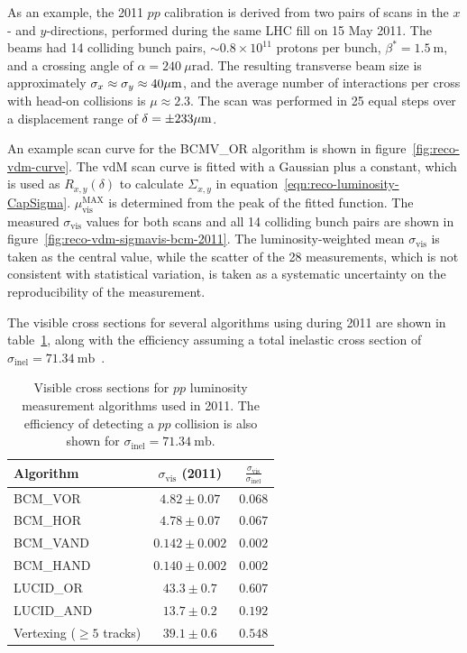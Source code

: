 As an example, the 2011 $pp$ calibration is derived from two pairs of scans in the $x$- and $y$-directions, performed during the same LHC fill on 15 May 2011. The beams had 14 colliding bunch pairs, $\sim0.8\times 10^11$ protons per bunch, $\beta^*=1.5~\mbox{m}$, and a crossing angle of $\alpha=240~\mu\mbox{rad}$. The resulting transverse beam size is approximately $\sigma_{x}\approx\sigma_{y}\approx 40 \mu\mathrm{m}$, and the average number of interactions per cross with head-on collisions is $\mu\approx 2.3$. The scan was performed in 25 equal steps over a displacement range of $\delta=\pm 233 \mu\mathrm{m}$.

An example scan curve for the BCMV\_OR algorithm is shown in figure~\ref{fig:reco-vdm-curve}. The vdM scan curve is fitted with a Gaussian plus a constant, which is used as $R_{x,y}(\delta)$ to calculate $\Sigma_{x,y}$ in equation~\ref{eqn:reco-luminosity-CapSigma}. $\mu_{\mathrm{vis}}^{\mathrm{MAX}}$ is determined from the peak of the fitted function. The measured $\sigma_{\mathrm{vis}}$ values for both scans and all 14 colliding bunch pairs are shown in figure~\ref{fig:reco-vdm-sigmavis-bcm-2011}. The luminosity-weighted mean $\sigma_{\mathrm{vis}}$ is taken as the central value, while the scatter of the 28 measurements, which is not consistent with statistical variation, is taken as a systematic uncertainty on the reproducibility of the measurement. 

The visible cross sections for several algorithms using during 2011 are shown in table~\ref{table:reco-luminosity-sigmavis-summary}, along with the efficiency assuming a total inelastic cross section of $\sigma_{\mathrm{inel}}= 71.34~\mbox{mb}$~\cite{TheATLASCollaboration:2014jo}.

\begin{table}[htbp]
	\centering
	\begin{tabular}{|l|c|c|}
		\hline
		Algorithm & $\sigma_{\mathrm{vis}}$ (2011) & $\frac{\sigma_{\mathrm{vis}}}{\sigma_{\mathrm{inel}}}$ \\
		\hline
		BCM\_VOR					&	$4.82\pm0.07$	&	$0.068$ \\
		\hline
		BCM\_HOR					&	$4.78\pm0.07$	&	$0.067$ \\
		\hline
		BCM\_VAND					&	$0.142\pm0.002$	&	$0.002$ \\
		\hline
		BCM\_HAND					&	$0.140\pm0.002$	&	$0.002$ \\
		\hline
		LUCID\_OR					&	$43.3\pm0.7$	&	$0.607$ \\
		\hline
		LUCID\_AND					&	$13.7\pm0.2$	&	$0.192$ \\
		\hline
		Vertexing ($\geq5$ tracks)	&	$39.1\pm0.6$	&	$0.548$ \\
		\hline
	\end{tabular}
	\caption{Visible cross sections for $pp$ luminosity measurement algorithms used in 2011. The efficiency of detecting a $pp$ collision is also shown for $\sigma_{\mathrm{inel}}=71.34~\mbox{mb}$.}
	\label{table:reco-luminosity-sigmavis-summary}
\end{table}



